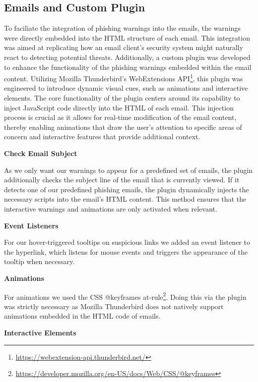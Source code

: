 \documentclass[
  a4paper,  %
  twoside,  %
  bibliography=totoc,
  headsepline,
  cleardoublepage=empty,
  parskip=half,
  draft=false
]{scrbook}
\begin{document}
\subsection{Emails and Custom Plugin}
To faciliate the integration of phishing warnings into the emails, the warnings were directly embedded into the HTML structure of each email. This integration was aimed at replicating how an email client's security system might naturally react to detecting potential threats.\newline
Additionally, a custom plugin was developed to enhance the functionality of the phishing warnings embedded within the email content. Utilizing Mozilla Thunderbird's WebExtensions API\footnote{ \href{https://webextension-api.thunderbird.net/}{https://webextension-api.thunderbird.net/}}, this plugin was engineered to introduce dynamic visual cues, such as animations and interactive elements.
The core functionality of the plugin centers around its capability to inject JavaScript code directly into the HTML of each email. This injection process is crucial as it allows for real-time modification of the email content, thereby enabling animations that draw the user's attention to specific areas of concern and interactive features that provide additional context.

\textbf{Check Email Subject}

As we only want our warnings to appear for a predefined set of emails, the plugin additionally checks the subject line of the email that is currently viewed. If it detects one of our predefined phishing emails, the plugin dynamically injects the necessary scripts into the email's HTML content. This method ensures that the interactive warnings and animations are only activated when relevant. 

\textbf{Event Listeners}

For our hover-triggered tooltips on suspicious links we added an event listener to the hyperlink, which listens for mouse events and triggers the appearance of the tooltip when necessary.

\textbf{Animations}

For animations we used the CSS @keyframes at-rule\footnote{ \href{https://developer.mozilla.org/en-US/docs/Web/CSS/@keyframes}{https://developer.mozilla.org/en-US/docs/Web/CSS/@keyframes}}. Doing this via the plugin was strictly necessary as Mozilla Thunderbird does not natively support animations embedded in the HTML code of emails. 

\textbf{Interactive Elements}
\end{document}

